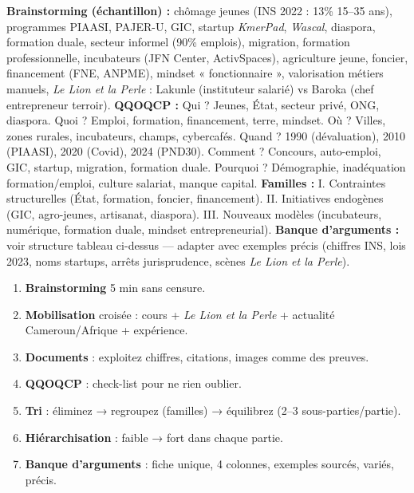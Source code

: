 \documentclass[11pt]{article}
\begin{document}
\begin{corrige}
\textbf{Brainstorming (échantillon) :} chômage jeunes (INS 2022 : 13\% 15–35 ans), programmes PIAASI, PAJER-U, GIC, startup \emph{KmerPad}, \emph{Wascal}, diaspora, formation duale, secteur informel (90\% emplois), migration, formation professionnelle, incubateurs (JFN Center, ActivSpaces), agriculture jeune, foncier, financement (FNE, ANPME), mindset « fonctionnaire », valorisation métiers manuels, \emph{Le Lion et la Perle} : Lakunle (instituteur salarié) vs Baroka (chef entrepreneur terroir).
\textbf{QQOQCP :} Qui ? Jeunes, État, secteur privé, ONG, diaspora. Quoi ? Emploi, formation, financement, terre, mindset. Où ? Villes, zones rurales, incubateurs, champs, cybercafés. Quand ? 1990 (dévaluation), 2010 (PIAASI), 2020 (Covid), 2024 (PND30). Comment ? Concours, auto-emploi, GIC, startup, migration, formation duale. Pourquoi ? Démographie, inadéquation formation/emploi, culture salariat, manque capital.
\textbf{Familles :} I. Contraintes structurelles (État, formation, foncier, financement). II. Initiatives endogènes (GIC, agro-jeunes, artisanat, diaspora). III. Nouveaux modèles (incubateurs, numérique, formation duale, mindset entrepreneurial).
\textbf{Banque d'arguments :} voir structure tableau ci-dessus — adapter avec exemples précis (chiffres INS, lois 2023, noms startups, arrêts jurisprudence, scènes \emph{Le Lion et la Perle}).
\end{corrige}

\begin{aretenir}
\begin{enumerate}
\item \textbf{Brainstorming} 5 min sans censure.
\item \textbf{Mobilisation} croisée : cours + \emph{Le Lion et la Perle} + actualité Cameroun/Afrique + expérience.
\item \textbf{Documents} : exploitez chiffres, citations, images comme des preuves.
\item \textbf{QQOQCP} : check-list pour ne rien oublier.
\item \textbf{Tri} : éliminez → regroupez (familles) → équilibrez (2–3 sous-parties/partie).
\item \textbf{Hiérarchisation} : faible → fort dans chaque partie.
\item \textbf{Banque d'arguments} : fiche unique, 4 colonnes, exemples sourcés, variés, précis.
\end{enumerate}
\end{aretenir}
\end{document}

